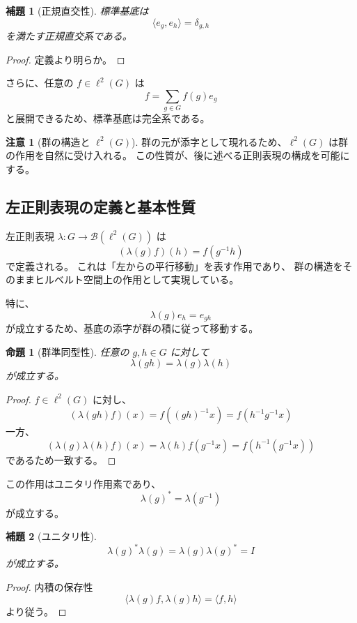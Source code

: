\documentclass[12pt,a4paper]{ltjarticle}
\newtheorem*{lemma}{補題}
\newtheorem*{proposition}{命題}
\theoremstyle{definition}
\newtheorem*{remark}{注意}
\begin{document}
\begin{lemma}[正規直交性]
標準基底は
\[
\langle e_g, e_h\rangle=\delta_{g,h}
\]
を満たす正規直交系である。
\end{lemma}

\begin{proof}
定義より明らか。
\end{proof}

さらに、任意の $f\in\ell^2(G)$ は
\[
f=\sum_{g\in G}f(g)e_g
\]
と展開できるため、標準基底は完全系である。

\begin{remark}[群の構造と $\ell^2(G)$]
群の元が添字として現れるため、$\ell^2(G)$ は群の作用を自然に受け入れる。
この性質が、後に述べる正則表現の構成を可能にする。
\end{remark}

\subsection{左正則表現の定義と基本性質}

左正則表現 $\lambda : G \to \mathcal{B}(\ell^2(G))$ は
\[
(\lambda(g)f)(h) = f(g^{-1}h)
\]
で定義される。
これは「左からの平行移動」を表す作用であり、
群の構造をそのままヒルベルト空間上の作用として実現している。

特に、
\[
\lambda(g)e_h = e_{gh}
\]
が成立するため、基底の添字が群の積に従って移動する。

\begin{proposition}[群準同型性]
任意の $g,h\in G$ に対して
\[
\lambda(gh)=\lambda(g)\lambda(h)
\]
が成立する。
\end{proposition}

\begin{proof}
$f\in\ell^2(G)$ に対し、
\[
(\lambda(gh)f)(x)=f((gh)^{-1}x)=f(h^{-1}g^{-1}x)
\]
一方、
\[
(\lambda(g)\lambda(h)f)(x)=\lambda(h)f(g^{-1}x)=f(h^{-1}(g^{-1}x))
\]
であるため一致する。
\end{proof}

この作用はユニタリ作用素であり、
\[
\lambda(g)^* = \lambda(g^{-1})
\]
が成立する。

\begin{lemma}[ユニタリ性]
\[
\lambda(g)^*\lambda(g)=\lambda(g)\lambda(g)^*=I
\]
が成立する。
\end{lemma}

\begin{proof}
内積の保存性
\[
\langle \lambda(g)f,\lambda(g)h\rangle=\langle f,h\rangle
\]
より従う。
\end{proof}
\end{document}
